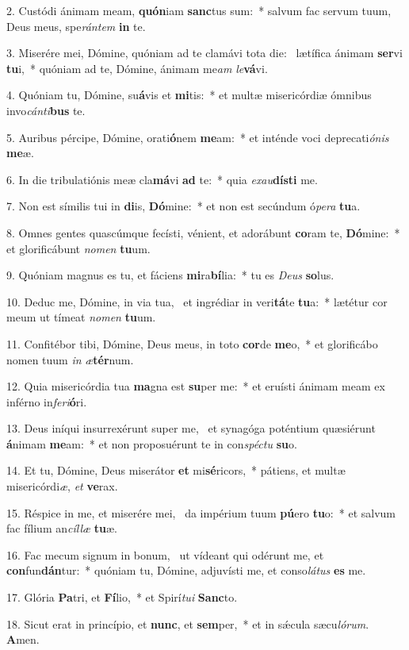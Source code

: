 2. Custódi ánimam meam, \textbf{quón}iam \textbf{sanc}tus sum:~*  salvum fac servum tuum, Deus meus, spe\textit{rán}\textit{tem} \textbf{in} te.\

3. Miserére mei, Dómine, quóniam ad te clamávi tota die: \dag\  lætífica ánimam \textbf{ser}vi \textbf{tu}i,~*  quóniam ad te, Dómine, ánimam me\textit{am} \textit{le}\textbf{vá}vi.\

4. Quóniam tu, Dómine, su\textbf{á}vis et \textbf{mi}tis:~*  et multæ misericórdiæ ómnibus invo\textit{cán}\textit{ti}\textbf{bus} te.\

5. Auribus pércipe, Dómine, orati\textbf{ó}nem \textbf{me}am:~*  et inténde voci deprecati\textit{ó}\textit{nis} \textbf{me}æ.\

6. In die tribulatiónis meæ cla\textbf{má}vi \textbf{ad} te:~*  quia \textit{ex}\textit{au}\textbf{dís}\textbf{ti} me.\

7. Non est símilis tui in \textbf{di}is, \textbf{Dó}mine:~*  et non est secúndum ó\textit{pe}\textit{ra} \textbf{tu}a.\

8. Omnes gentes quascúmque fecísti, vénient, et adorábunt \textbf{co}ram te, \textbf{Dó}mine:~*  et glorificábunt \textit{no}\textit{men} \textbf{tu}um.\

9. Quóniam magnus es tu, et fáciens \textbf{mi}ra\textbf{bí}lia:~*  tu es \textit{De}\textit{us} \textbf{so}lus.\

10. Deduc me, Dómine, in via tua, \dag\  et ingrédiar in veri\textbf{tá}te \textbf{tu}a:~*  lætétur cor meum ut tímeat \textit{no}\textit{men} \textbf{tu}um.\

11. Confitébor tibi, Dómine, Deus meus, in toto \textbf{cor}de \textbf{me}o,~*  et glorificábo nomen tuum \textit{in} \textit{æ}\textbf{tér}num.\

12. Quia misericórdia tua \textbf{ma}gna est \textbf{su}per me:~*  et eruísti ánimam meam ex inférno in\textit{fe}\textit{ri}\textbf{ó}ri.\

13. Deus iníqui insurrexérunt super me, \dag\  et synagóga poténtium quæsiérunt \textbf{á}nimam \textbf{me}am:~*  et non proposuérunt te in con\textit{spéc}\textit{tu} \textbf{su}o.\

14. Et tu, Dómine, Deus miserátor \textbf{et} mi\textbf{sé}ricors,~*  pátiens, et multæ misericórdi\textit{æ}, \textit{et} \textbf{ve}rax.\

15. Réspice in me, et miserére mei, \dag\  da impérium tuum \textbf{pú}ero \textbf{tu}o:~*  et salvum fac fílium an\textit{cíl}\textit{læ} \textbf{tu}æ.\

16. Fac mecum signum in bonum, \dag\  ut vídeant qui odérunt me, et \textbf{con}fun\textbf{dán}tur:~*  quóniam tu, Dómine, adjuvísti me, et conso\textit{lá}\textit{tus} \textbf{es} me.\

17. Glória \textbf{Pa}tri, et \textbf{Fí}lio,~*  et Spirí\textit{tu}\textit{i} \textbf{Sanc}to.\

18. Sicut erat in princípio, et \textbf{nunc}, et \textbf{sem}per,~*  et in sǽcula sæcu\textit{ló}\textit{rum}. \textbf{A}men.\

